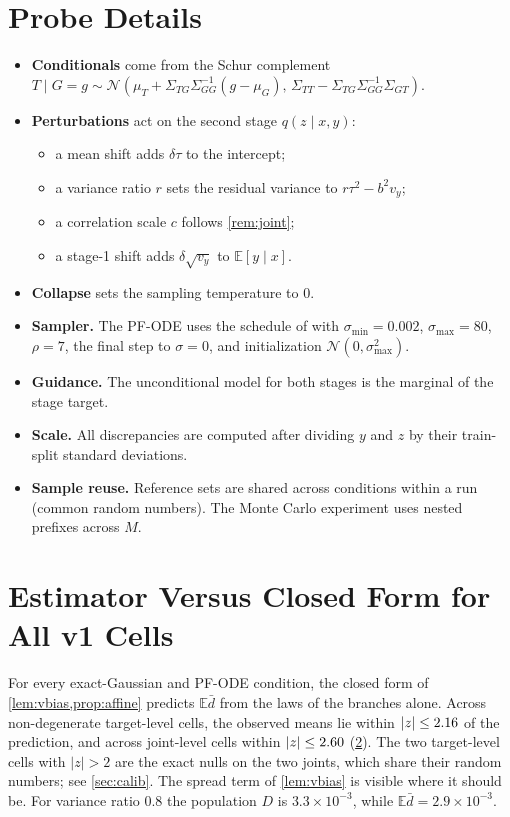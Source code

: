 \documentclass{article}
\theoremstyle{plain}
\theoremstyle{definition}
\theoremstyle{remark}
\newcommand{\E}{\mathbb{E}}
\begin{document}
\section{Probe Details}
\label{app:probe}
\begin{itemize}
\item \textbf{Conditionals} come from the Schur complement $T\mid G=g\sim\mathcal N(\mu_T+\Sigma_{TG}\Sigma_{GG}^{-1}(g-\mu_G),\,\Sigma_{TT}-\Sigma_{TG}\Sigma_{GG}^{-1}\Sigma_{GT})$.
\item \textbf{Perturbations} act on the second stage $q(z\mid x,y)$:
  \begin{itemize}
  \item a mean shift adds $\delta\tau$ to the intercept;
  \item a variance ratio $r$ sets the residual variance to $r\tau^2-b^2v_y$;
  \item a correlation scale $c$ follows \cref{rem:joint};
  \item a stage-1 shift adds $\delta\sqrt{v_y}$ to $\E[y\mid x]$.
  \end{itemize}
\item \textbf{Collapse} sets the sampling temperature to $0$.
\item \textbf{Sampler.} The PF-ODE uses the schedule of \citet{karras2022edm} with $\sigma_{\min}=0.002$, $\sigma_{\max}=80$, $\rho=7$, the final step to $\sigma=0$, and initialization $\mathcal N(0,\sigma_{\max}^2)$.
\item \textbf{Guidance.} The unconditional model for both stages is the marginal of the stage target.
\item \textbf{Scale.} All discrepancies are computed after dividing $y$ and $z$ by their train-split standard deviations.
\item \textbf{Sample reuse.} Reference sets are shared across conditions within a run (common random numbers). The Monte Carlo experiment uses nested prefixes across $M$.
\end{itemize}

\section{Estimator Versus Closed Form for All v1 Cells}
\label{app:reanalysis}\label{sec:exp-estimator}

For every exact-Gaussian and PF-ODE condition, the closed form of \cref{lem:vbias,prop:affine} predicts $\E\bar d$ from the laws of the branches alone.
Across \numPredCellsT{} non-degenerate target-level cells, the observed means lie within $|z|\le2.16$ of the prediction, and across \numPredCellsJ{} joint-level cells within $|z|\le2.60$ (\cref{app:reanalysis}).
The two target-level cells with $|z|>2$ are the exact nulls on the two joints, which share their random numbers; see \cref{sec:calib}.
The spread term of \cref{lem:vbias} is visible where it should be. For variance ratio $0.8$ the population $D$ is $3.3\times10^{-3}$, while $\E\bar d=2.9\times10^{-3}$.
\end{document}
